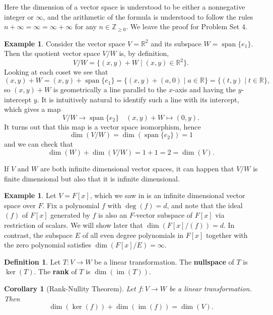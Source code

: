 \documentclass[12pt]{report}
\newtheorem{corollary}[theorem]{Corollary}
\numberwithin{equation}{section}
\numberwithin{theorem}{chapter}
\theoremstyle{definition}
\newtheorem{definition}[theorem]{Definition}
\newtheorem{example}[theorem]{Example}
\newtheorem*{basic properties}{Basic Properties}
\newtheorem*{Important Remark}{Important Remark}
\newcommand{\df}[1]{{\bf #1}\index{#1}}
\newcommand{\R}{\mathbb{R}}
\newcommand{\Z}{\mathbb{Z}}
\renewcommand{\ker}{\operatorname{ker}}
\DeclareMathOperator{\im}{im}
\DeclareMathOperator{\Span}{span}
\begin{document}
Here the dimension of a vector space is understood to be either a nonnegative integer or $\infty$, and  the arithmetic of the formula is understood to follow the rules  $n+\infty=\infty=\infty+\infty$ for any $n\in \Z_{\geqslant 0}$. 
We leave the proof for Problem Set 4.
 


\begin{example}
Consider the vector space $V = \R^2$ and its subspace $W=\Span\{e_1\}$. Then the quotient vector space $V/W$ is, by definition,
$$V/W=\{(x,y)+W \mid (x,y)\in \R^2\}.$$
Looking at each coset we see that
$$(x,y)+W=(x,y)+\Span\{e_1\}=\{(x,y)+(a,0)\mid a\in \R\}=\{(t,y)\mid t\in \R\},$$
so $(x,y)+W$ is geometrically a line parallel to the $x$-axis and having the $y$-intercept $y$. It is intuitively natural to identify such a line with its intercept, which gives a map
$$V/W\to \Span\{e_2\} \quad (x,y)+W \mapsto (0,y).$$
It turns out that this map is a vector space isomorphism, hence 
$$\dim(V/W) = \dim(\Span\{e_2\}) = 1$$ 
and we can check that 
$$\dim(W) + \dim(V/W) = 1+1 = 2 = \dim(V).$$
\end{example}


 
If $V$ and $W$ are both infinite dimensional vector spaces, it can happen that $V/W$ is finite dimensional but also that it is infinite dimensional.
 
\begin{example}
Let $V=F[x]$, which we saw in  is an infinite dimensional vector space over $F$. Fix a polynomial $f$ with $\deg(f)=d$, and note that the ideal $(f)$ of $F[x]$ generated by $f$ is also an $F$-vector subspace of $F[x]$ via restriction of scalars. We will show later that $\dim(F[x]/(f))=d$. In contrast, the subspace $E$ of all even degree polynomials in $F[x]$ together with the zero polynomial satisfies $\dim(F[x]/E)=\infty$.
\end{example}
 
 
 
\begin{definition} 
Let $T\!: V \to W$ be a linear transformation. The \df{nullspace} of $T$ is $\ker(T)$. The \df{rank} of $T$ is $\dim(\im(T))$. 
 \end{definition}

 
 \begin{corollary}[Rank-Nullity Theorem]\label{rank nulity}
 Let $f\!: V \to W$ be a linear transformation. Then 
 $$\dim(\ker(f)) + \dim(\im(f)) = \dim(V).$$
 \end{corollary} 
 
\end{document}
